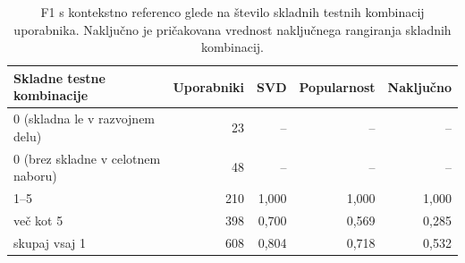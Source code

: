 \begin{table}[htbp]
\centering
\caption{F1 s kontekstno referenco glede na število skladnih testnih kombinacij uporabnika. Naključno je pričakovana vrednost naključnega rangiranja skladnih kombinacij.}
\label{tab:context_breakdown}
\footnotesize
\setlength{\tabcolsep}{4pt}
\begin{tabular}{lrrrr}
\toprule
Skladne testne kombinacije & Uporabniki & SVD & Popularnost & Naključno \\
\midrule
0 (skladna le v razvojnem delu) & 23 & -- & -- & -- \\
0 (brez skladne v celotnem naboru) & 48 & -- & -- & -- \\
1–5 & 210 & 1,000 & 1,000 & 1,000 \\
več kot 5 & 398 & 0,700 & 0,569 & 0,285 \\
skupaj vsaj 1 & 608 & 0,804 & 0,718 & 0,532 \\
\bottomrule
\end{tabular}

\end{table}
